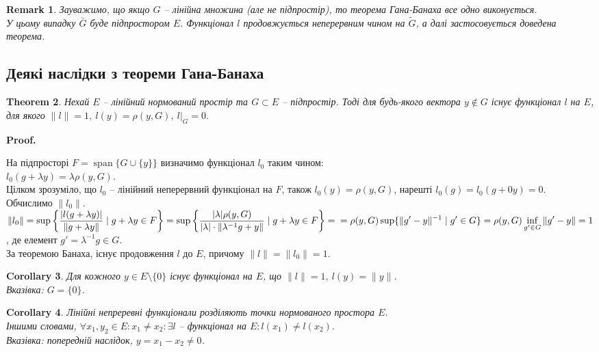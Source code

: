 \documentclass[a4paper, 10pt]{article}
\makeatletter
\theoremstyle{theoremdd}
\newtheorem{theorem}{Theorem}[subsection]
\theoremstyle{theoremdd}
\theoremstyle{theoremdd}
\theoremstyle{theoremdd}
\theoremstyle{theoremdd}
\theoremstyle{theoremdd}
\newtheorem{remark}[theorem]{Remark}
\theoremstyle{theoremdd}
\theoremstyle{theoremdd}
\newtheorem{corollary}[theorem]{Corollary}
\renewenvironment{proof}[1][Proof.\\]{\par
\pushQED{\hfill \qed}%
\normalfont \topsep6\p@\@plus6\p@\relax
\trivlist
\item\relax
{\bfseries
#1\@addpunct{.}}\hspace\labelsep\ignorespaces
}{%
\popQED\endtrivlist\@endpefalse
}
\DeclareMathOperator{\linspan}{span}
\makeatother
\begin{document}
\begin{remark}
Зауважимо, що якщо $G$ -- лінійна множина (але не підпростір), то теорема Гана-Банаха все одно виконується.\\
У цьому випадку $\bar{G}$ буде підпростором $E$. Функціонал $l$ продовжується неперервним чином на $\tilde{G}$, а далі застосовується доведена теорема.
\end{remark}


\subsection{Деякі наслідки з теореми Гана-Банаха}
\begin{theorem}
Нехай $E$ -- лінійний нормований простір та $G \subset E$ -- підпростір. Тоді для будь-якого вектора $y \notin G$ існує функціонал $l$ на $E$, для якого $\|l\| = 1,\ l(y) = \rho(y,G),\ l|_G = 0$.
\end{theorem}

\begin{proof}
На підпросторі $F = \linspan\{G \cup \{y\}\}$ визначимо функціонал $l_0$ таким чином:\\
$l_0(g + \lambda y) = \lambda \rho(y,G)$.\\
Цілком зрозуміло, що $l_0$ -- лінійний неперервний функціонал на $F$, також $l_0(y) = \rho(y,G)$, нарешті $l_0(g) = l_0(g+0y) = 0$. Обчислимо $\|l_0\|$.\\
$\|l_0\| = \displaystyle\sup \left\{ \dfrac{|l(g+\lambda y)|}{\|g+\lambda y\|} \mid g + \lambda y \in F \right\} = \sup\left\{ \dfrac{|\lambda| \rho(y,G)}{|\lambda| \cdot \|\lambda^{-1}g + y \|} \mid g+\lambda y \in F \right\} = \\ = \rho(y,G) \sup \{ \|g'-y\|^{-1} \mid g' \in G \} = \rho(y,G) \inf_{g' \in G} \|g'-y\| = 1$, де елемент $g' = \lambda^{-1}g \in G$.\\
За теоремою Банаха, існує продовження $l$ до $E$, причому $\|l\| = \|l_0\| = 1$.
\end{proof}

\begin{corollary}
Для кожного $y \in E \setminus \{0\}$ існує функціонал на $E$, що $\|l\| = 1,\ l(y) = \|y\|$.\\
\textit{Вказівка: $G = \{0\}$}.
\end{corollary}

\begin{corollary}
Лінійні непреревні функціонали розділяють точки нормованого простора $E$.\\
Іншими словами, $\forall x_1,y_2 \in E: x_1 \neq x_2: \exists l$ -- функціонал на $E: l(x_1) \neq l(x_2)$.\\
\textit{Вказівка: попередній наслідок, $y = x_1 - x_2 \neq 0$.}
\end{corollary}
\end{document}
